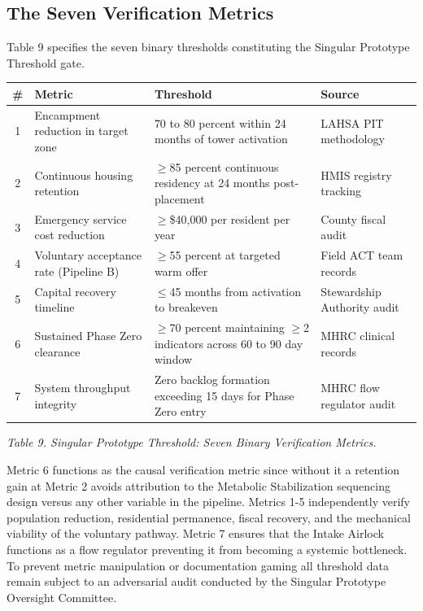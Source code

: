 \documentclass[12pt, letterpaper]{article}
\begin{document}
\subsection{The Seven Verification Metrics}

Table 9 specifies the seven binary thresholds constituting the Singular Prototype Threshold gate.

{\singlespacing
\begin{tabularx}{\textwidth}{@{}cp{4.5cm}Xp{4.2cm}@{}}
\toprule
\rowcolor{rowgray}
\# & Metric & Threshold & Source \\
\midrule
1 & Encampment reduction in target zone & 70 to 80 percent within 24 months of tower activation & LAHSA PIT methodology \\
\rowcolor{rowgray}
2 & Continuous housing retention & $\geq$85 percent continuous residency at 24 months post-placement & HMIS registry tracking \\
3 & Emergency service cost reduction & $\geq$\$40,000 per resident per year & County fiscal audit \\
\rowcolor{rowgray}
4 & Voluntary acceptance rate (Pipeline B) & $\geq$55 percent at targeted warm offer & Field ACT team records \\
5 & Capital recovery timeline & $\leq$45 months from activation to breakeven & Stewardship Authority audit \\
\rowcolor{rowgray}
6 & Sustained Phase Zero clearance & $\geq$70 percent maintaining $\geq$2 indicators across 60 to 90 day window & MHRC clinical records \\
7 & System throughput integrity & Zero backlog formation exceeding 15 days for Phase Zero entry & MHRC flow regulator audit \\
\bottomrule
\end{tabularx}\par
\vspace{8pt}
\noindent\textit{Table 9. Singular Prototype Threshold: Seven Binary Verification Metrics.}
\par}

Metric 6 functions as the causal verification metric since without it a retention gain at Metric 2 avoids attribution to the Metabolic Stabilization sequencing design versus any other variable in the pipeline. Metrics 1-5 independently verify population reduction, residential permanence, fiscal recovery, and the mechanical viability of the voluntary pathway. Metric 7 ensures that the Intake Airlock functions as a flow regulator preventing it from becoming a systemic bottleneck. To prevent metric manipulation or documentation gaming all threshold data remain subject to an adversarial audit conducted by the Singular Prototype Oversight Committee.
\end{document}
